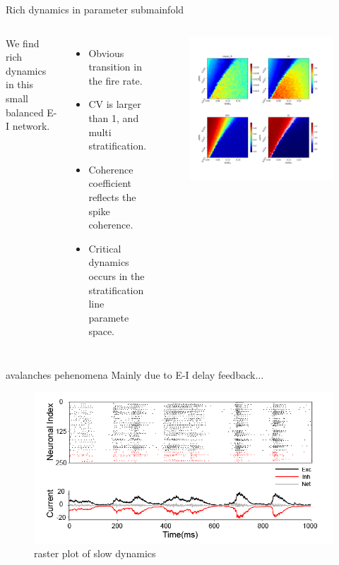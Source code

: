 \documentclass{beamer}
\begin{document}
\begin{frame}{Rich dynamics in parameter submainfold}
	\begin{columns}
		We find rich dynamics in this small balanced E-I network.
		\begin{itemize}
			\item Obvious transition in the fire rate.
			\item CV is larger than 1, and multi stratification.
			\item Coherence coefficient reflects the spike coherence.
			\item Critical dynamics occurs in the stratification line paramete space.
		\end{itemize}
		\begin{figure}[htbp]
			\centering
			\includegraphics[scale=0.25]{fig/phase_plot}
		\end{figure}
	\end{columns}
\end{frame}

\begin{frame}{avalanches pehenomena}
	Mainly due to E-I delay feedback$\ldots$
	\begin{figure}[htbp]
		\centering
		\includegraphics[width=0.9\linewidth]{fig/raster}
		\caption{raster plot of slow dynamics}
		\label{raster plot}
	\end{figure}
\end{frame}
	
\end{document}
